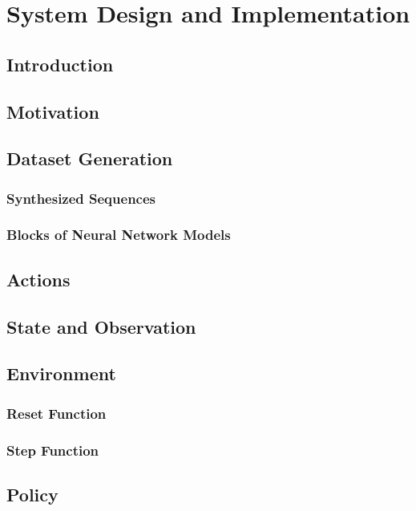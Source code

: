 \chapter{System Design and Implementation}
\label{ch:design-implementation}

\section{Introduction}

\section{Motivation}

\section{Dataset Generation}
\subsection{Synthesized Sequences}
\subsection{Blocks of Neural Network Models}

\section{Actions}

\section{State and Observation}

\section{Environment}
\subsection{Reset Function}
\subsection{Step Function}

\section{Policy}

